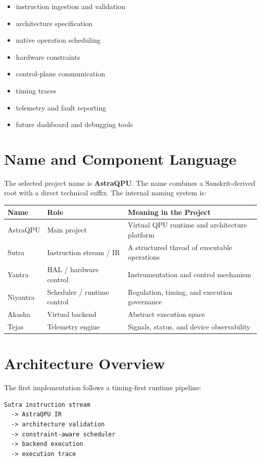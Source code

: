\documentclass[11pt,a4paper]{article}
\begin{document}
\begin{itemize}[leftmargin=*]
  \item instruction ingestion and validation
  \item architecture specification
  \item native operation scheduling
  \item hardware constraints
  \item control-plane communication
  \item timing traces
  \item telemetry and fault reporting
  \item future dashboard and debugging tools
\end{itemize}

\section{Name and Component Language}

The selected project name is \textbf{AstraQPU}. The name combines a Sanskrit-derived root with a direct technical suffix. The internal naming system is:

\begin{longtable}{lll}
\toprule
Name & Role & Meaning in the Project \\
\midrule
AstraQPU & Main project & Virtual QPU runtime and architecture platform \\
Sutra & Instruction stream / IR & A structured thread of executable operations \\
Yantra & HAL / hardware control & Instrumentation and control mechanism \\
Niyantra & Scheduler / runtime control & Regulation, timing, and execution governance \\
Akasha & Virtual backend & Abstract execution space \\
Tejas & Telemetry engine & Signals, status, and device observability \\
\bottomrule
\end{longtable}

\section{Architecture Overview}

The first implementation follows a timing-first runtime pipeline:

\begin{lstlisting}[style=astra]
Sutra instruction stream
  -> AstraQPU IR
  -> architecture validation
  -> constraint-aware scheduler
  -> backend execution
  -> execution trace
\end{lstlisting}
\end{document}
